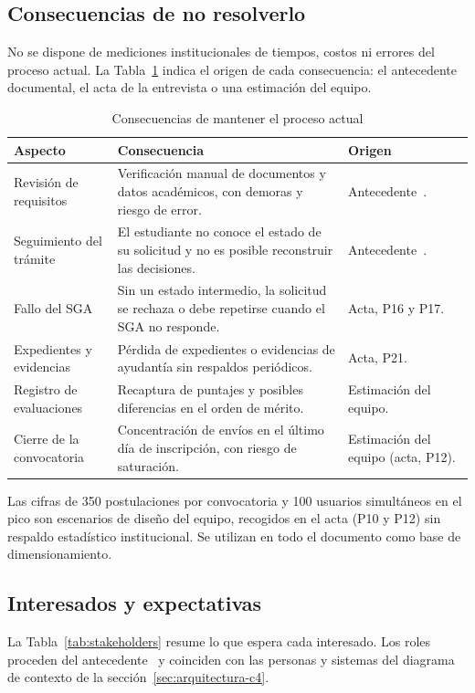 \subsection{Consecuencias de no resolverlo}
No se dispone de mediciones institucionales de tiempos, costos ni errores del proceso actual. La Tabla~\ref{tab:consecuencias} indica el origen de cada consecuencia: el antecedente documental, el acta de la entrevista o una estimación del equipo.

\begin{table}[htbp]
\centering\small
\caption{Consecuencias de mantener el proceso actual}
\label{tab:consecuencias}
\begin{tabularx}{\textwidth}{@{}>{\raggedright\arraybackslash}p{3.0cm}>{\raggedright\arraybackslash}X>{\raggedright\arraybackslash}p{3.4cm}@{}}
\toprule
\textbf{Aspecto} & \textbf{Consecuencia} & \textbf{Origen}\\
\midrule
Revisión de requisitos & Verificación manual de documentos y datos académicos, con demoras y riesgo de error. & Antecedente~\cite{sgacAntecedente}.\\
Seguimiento del trámite & El estudiante no conoce el estado de su solicitud y no es posible reconstruir las decisiones. & Antecedente~\cite{sgacAntecedente}.\\
Fallo del SGA & Sin un estado intermedio, la solicitud se rechaza o debe repetirse cuando el SGA no responde. & Acta, P16 y P17.\\
Expedientes y evidencias & Pérdida de expedientes o evidencias de ayudantía sin respaldos periódicos. & Acta, P21.\\
Registro de evaluaciones & Recaptura de puntajes y posibles diferencias en el orden de mérito. & Estimación del equipo.\\
Cierre de la convocatoria & Concentración de envíos en el último día de inscripción, con riesgo de saturación. & Estimación del equipo (acta, P12).\\
\bottomrule
\end{tabularx}
\end{table}

Las cifras de 350 postulaciones por convocatoria y 100 usuarios simultáneos en el pico son escenarios de diseño del equipo, recogidos en el acta (P10 y P12) sin respaldo estadístico institucional. Se utilizan en todo el documento como base de dimensionamiento.

\subsection{Interesados y expectativas}
La Tabla~\ref{tab:stakeholders} resume lo que espera cada interesado. Los roles proceden del antecedente~\cite{sgacAntecedente} y coinciden con las personas y sistemas del diagrama de contexto de la sección~\ref{sec:arquitectura-c4}.

